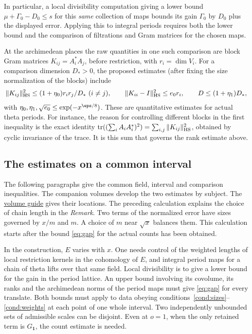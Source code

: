 \documentclass[a4paper,11pt]{article}
\theoremstyle{definition}
\theoremstyle{remark}
\numberwithin{equation}{section}
\begin{document}
In particular, a local divisibility computation giving a lower bound \(\mu+\Gamma_0-D_0\le s\) for this \emph{same} collection of maps bounds its gain \(\Gamma_0\) by \(D_0\) plus the displayed error. Applying this to integral periods requires both the lower bound and the comparison of filtrations and Gram matrices for the chosen maps.

At the archimedean places the raw quantities in one such comparison are block Gram matrices \(K_{ij}=A_i^*A_j\), before restriction, with \(r_i=\dim V_i\). For a comparison dimension \(D_*>0\), the proposed estimates (after fixing the size normalization of the blocks) include
\[
 \|K_{ij}\|_{\rm HS}^2\le(1+\eta_0)r_ir_j/D_*\ (i\ne j),\qquad
 \|K_{ii}-I\|_{\rm HS}^2\le e_0r_i,\qquad D\le(1+\eta_1)D_* ,
\]
with \(\eta_0,\eta_1,\sqrt{e_0}\le\exp(-x^{\eps/8})\). These are quantitative estimates for actual theta periods. For instance, the reason for controlling different blocks in the first inequality is the exact identity \(\operatorname{tr}((\sum_i A_iA_i^*)^2)=\sum_{i,j}\|K_{ij}\|_{\rm HS}^2\), obtained by cyclic invariance of the trace. It is this sum that governs the rank estimate above.

\subsection{The estimates on a common interval}\label{nav:I-28}
\label{sec:missing}
\noindent The following paragraphs give the common field, interval and comparison inequalities. The companion volumes develop the two estimates by subject. The \hyperref[seriesguide]{volume guide} gives their locations.
The preceding calculation explains the choice of chain length in the \emph{Remark}. Two terms of the normalized error have sizes governed by \(x/m\) and \(m\). A choice of \(m\) near \(\sqrt{x}\) balances them. This calculation starts after the bound \eqref{eq:gap} for the actual counts has been obtained.

In the construction, \(E\) varies with \(x\). One needs control of the weighted lengths of local restriction kernels in the cohomology of \(E\), and integral period maps for a chain of theta lifts over that same field. Local divisibility is to give a lower bound for the gain in the period lattice. An upper bound involving its covolume, its ranks and the archimedean norms of the period maps must give \eqref{eq:gap} for every translate. Both bounds must apply to data obeying conditions~\ref{cond:sizes}--\ref{cond:weights} at each point of one whole interval. Two independently unbounded sets of admissible scales can be disjoint. Even at \(o=1\), when the only retained term is \(G_{\mathbf1}\), the count estimate is needed.
\end{document}
